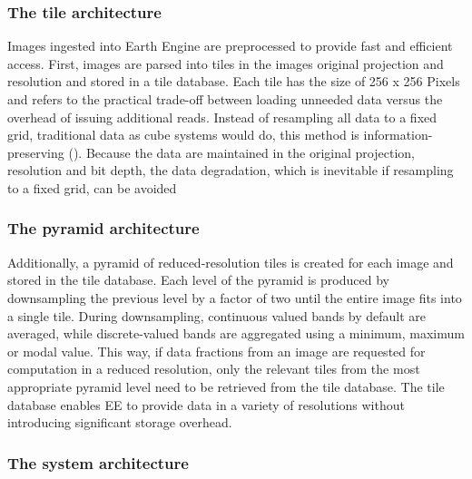 \subsubsection{The tile architecture}

Images ingested into Earth Engine are preprocessed to provide fast and efficient access. First, images are parsed into tiles in the images original projection and resolution and stored in a tile database. Each tile has the size of 256 x 256 Pixels and refers to the practical trade-off between loading unneeded data versus the overhead of issuing additional reads. Instead of resampling all data to a fixed grid, traditional data as cube systems would do, this method is information-preserving (\cite{gray1997data}). Because the data are maintained in the original projection, resolution and bit depth, the data degradation, which is inevitable if resampling to a fixed grid, can be avoided

\subsubsection{The pyramid architecture}

Additionally, a pyramid of reduced-resolution tiles is created for each image and stored in the tile database. Each level of the pyramid is produced by downsampling the previous level by a factor of two until the entire image fits into a single tile. During downsampling, continuous valued bands by default are averaged, while discrete-valued bands are aggregated using a minimum, maximum or modal value. This way, if data fractions from an image are requested for computation in a reduced resolution, only the relevant tiles from the most appropriate pyramid level need to be retrieved from the tile database. The tile database enables EE to provide data in a variety of resolutions without introducing significant storage overhead.

\subsubsection{The system architecture}

